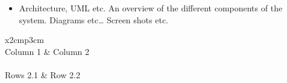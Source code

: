 \begin{figure}[H]
\begin{minipage}{.25\textwidth}
  \label{fig:test2}
\end{minipage}
\end{figure}

\begin{itemize}
\item Architecture, UML etc. An overview of the different components of the system. Diagrams etc… Screen shots etc.
\end{itemize}

\begin{table}[h]
  \centering
  \begin{tabular}{x{2cm}p{3cm}}
    \toprule \\
    Column 1 & Column 2 \\
    \midrule \\
    Rows 2.1 & Row 2.2 \\
    \bottomrule
  \end{tabular}
  \caption{A table.}
  \label{table:mytable}
\end{table}